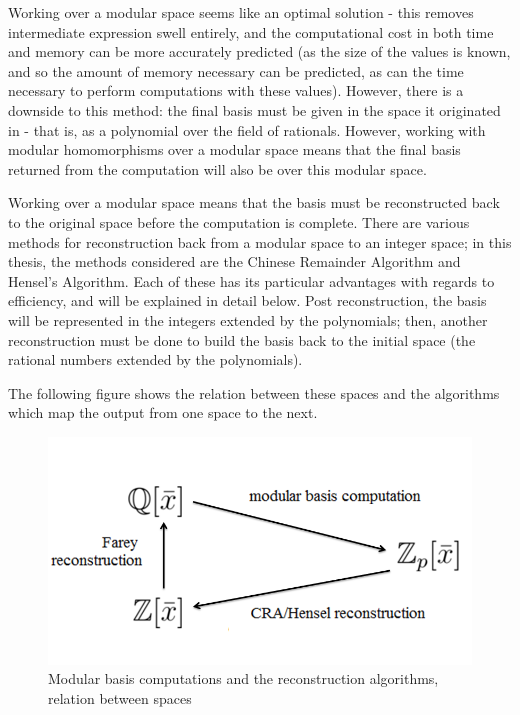 \documentclass[letterpaper,12pt,titlepage,oneside,final]{book}
\begin{document}
Working over a modular space seems like an optimal solution - this removes intermediate expression swell entirely, and the computational cost in both time and memory can be more accurately predicted (as the size of the values is known, and so the amount of memory necessary can be predicted, as can the time necessary to perform computations with these values).  However, there is a downside to this method: the final basis must be given in the space it originated in - that is, as a polynomial over the field of rationals.  However, working with modular homomorphisms over a modular space means that the final basis returned from the computation will also be over this modular space.  

Working over a modular space means that the basis must be reconstructed back to the original space before the computation is complete.  There are various methods for reconstruction back from a modular space to an integer space; in this thesis, the methods considered are the Chinese Remainder Algorithm and Hensel's Algorithm.  Each of these has its particular advantages with regards to efficiency, and will be explained in detail below.  Post reconstruction, the basis will be represented in the integers extended by the polynomials; then, another reconstruction must be done to build the basis back to the initial space (the rational numbers extended by the polynomials).    

The following figure shows the relation between these spaces and the algorithms which map the output from one space to the next.

\begin{figure}[H]
  \centering
  \includegraphics[scale=0.5]{reconstructionRelations.png}
  \caption{Modular basis computations and the reconstruction algorithms, relation between spaces \label{fig:bb_tests}}
\end{figure}
\end{document}
